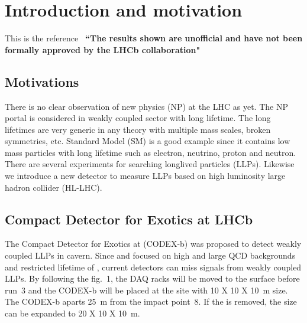 \section{Introduction and motivation}
\label{sec:Introduction}

This is the reference~\cite{Gligorov:2017nwh}
\newline
\textbf{``The results shown are unofficial and have not been formally approved by the LHCb collaboration"}

\subsection{Motivations}

There is no clear observation of new physics (NP) at the LHC as yet. The NP portal is considered in weakly coupled sector with long lifetime. 
The long lifetimes are very generic in any theory with multiple mass scales, broken symmetries, etc. 
Standard Model (SM) is a good example since it contains low mass particles with long lifetime such as electron, neutrino, proton and neutron.
There are several experiments for searching longlived particles (LLPs). 
Likewise we introduce a new detector to measure LLPs based on high luminosity large hadron collider (HL-LHC).

\subsection{Compact Detector for Exotics at LHCb}

The Compact Detector for Exotics at \lhcb (CODEX-b) was proposed to detect weakly coupled LLPs in \lhcb cavern. 
Since \atlas and \cms focused on high \pt and large QCD backgrounds and restricted lifetime of \lhcb, current detectors can miss signals from weakly coupled LLPs. 
By following the fig.~1, the DAQ racks will be moved to the surface before run~3 and the CODEX-b will be placed at the site with 10 X 10 X 10~m size. 
The CODEX-b aparts 25~m from the impact point~8. 
If the \delphi is removed, the size can be expanded to 20 X 10 X 10~m.

